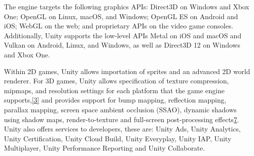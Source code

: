 \begin{itemize}
The engine targets the following graphics APIs: Direct3D on Windows and Xbox One; OpenGL on Linux, macOS, and Windows; OpenGL ES on Android and iOS; WebGL on the web; and proprietary APIs on the video game consoles. Additionally, Unity supports the low-level APIs Metal on iOS and macOS and Vulkan on Android, Linux, and Windows, as well as Direct3D 12 on Windows and Xbox One.

Within 2D games, Unity allows importation of sprites and an advanced 2D world renderer. For 3D games, Unity allows specification of texture compression, mipmaps, and resolution settings for each platform that the game engine supports,\href{https://unity3d.com/cn/unity/features/multiplatform}{[3]} and provides support for bump mapping, reflection mapping, parallax mapping, screen space ambient occlusion (SSAO), dynamic shadows using shadow maps, render-to-texture and full-screen post-processing effects\href{https://web.archive.org/web/20130312140345/http://docs.unity3d.com/Documentation/Manual/DirectX11.html}{7}. Unity also offers services to developers, these are: Unity Ads, Unity Analytics, Unity Certification, Unity Cloud Build, Unity Everyplay, Unity IAP, Unity Multiplayer, Unity Performance Reporting and Unity Collaborate.



\end{itemize}
